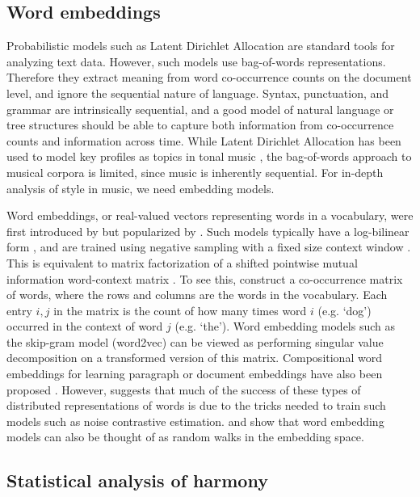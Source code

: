 
\subsection{Word embeddings}
Probabilistic models such as Latent Dirichlet Allocation \cite{Blei2003} are standard tools for analyzing text data. However, such models use bag-of-words representations. Therefore they extract meaning from word co-occurrence counts on the document level, and ignore the sequential nature of language. Syntax, punctuation, and grammar are intrinsically sequential, and a good model of natural language or tree structures should be able to capture both information from co-occurrence counts and information across time. While Latent Dirichlet Allocation has been used to model key profiles as topics in tonal music \cite{Hu2009}, the bag-of-words approach to musical corpora is limited, since music is inherently sequential. For in-depth analysis of style in music, we need embedding models.

Word embeddings, or real-valued vectors representing words in a vocabulary, were first introduced by \cite{Bengio2003} but popularized by \cite{Mikolov2013a}. Such models typically have a log-bilinear form \cite{Mnih2007}, and are trained using negative sampling with a fixed size context window \cite{Mikolov2013a}. This is equivalent to matrix factorization of a shifted pointwise mutual information word-context matrix \cite{Levy}. To see this, construct a co-occurrence matrix of words, where the rows and columns are the words in the vocabulary. Each entry $i, j$ in the matrix is the count of how many times word $i$ (e.g. `dog') occurred in the context of word $j$ (e.g. `the'). Word embedding models such as the skip-gram model (word2vec) can be viewed as performing singular value decomposition on a transformed version of this matrix.  Compositional word embeddings for learning paragraph or document embeddings have also been proposed \cite{Le2014,Dai2015}. However, \cite{Levy2015a} suggests that much of the success of these types of distributed representations of words is due to the tricks needed to train such models such as noise contrastive estimation. \cite{Arora2015} and \cite{Arora2016} show that word embedding models can also be thought of as random walks in the embedding space.


\subsection{Statistical analysis of harmony}

